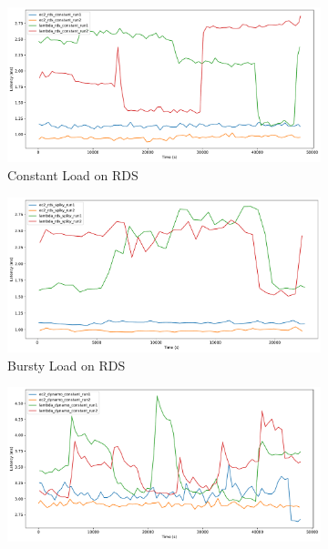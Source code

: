\begin{figure}[h]
	\begin{subfigure}{0.49\linewidth}
		\centering
		\includegraphics[width=\linewidth]{./fig/ts-rds-constant.pdf}
		\caption{Constant Load on RDS}
		\label{fig:ts_rds_const}
	\end{subfigure}
	\hfill
	\begin{subfigure}{0.49\linewidth}
		\centering
		\includegraphics[width=\linewidth]{./fig/ts-rds-bursty.pdf}
		\caption{Bursty Load on RDS}
		\label{fig:ts_rds_bursty}
	\end{subfigure}
	\vfill
	\begin{subfigure}{0.49\linewidth}
		\centering
		\includegraphics[width=\linewidth]{./fig/ts-dynamo-constant.pdf}

\end{subfigure}
\end{figure}
